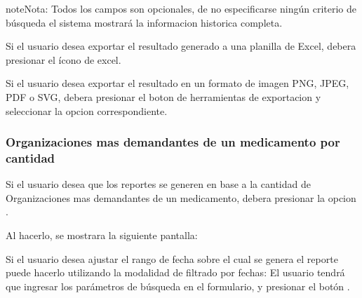 \documentclass[a4paper,10pt,spanish]{sphinxmanual}
\begin{document}
\begin{notice}{note}{Nota:}
Todos los campos son opcionales, de no especificarse ningún criterio de búsqueda el sistema mostrará la informacion historica completa.
\end{notice}


Si el usuario desea exportar el resultado generado a una planilla de Excel, debera presionar el ícono de excel.


Si el usuario desea exportar el resultado en un formato de imagen PNG, JPEG, PDF o SVG, debera presionar el boton de herramientas de exportacion y seleccionar la opcion correspondiente.



\subsubsection{Organizaciones mas demandantes de un medicamento por cantidad}
\label{medicams:org-cant-pc}\label{medicams:organizaciones-mas-demandantes-de-un-medicamento-por-cantidad}
Si el usuario desea que los reportes se generen en base a la cantidad de Organizaciones mas demandantes de un medicamento, debera presionar la opcion .


Al hacerlo, se mostrara la siguiente pantalla:


Si el usuario desea ajustar el rango de fecha sobre el cual se genera el reporte puede hacerlo utilizando la modalidad de filtrado por fechas:
El usuario tendrá que ingresar los parámetros de búsqueda en el formulario, y presionar el botón .
\end{document}
